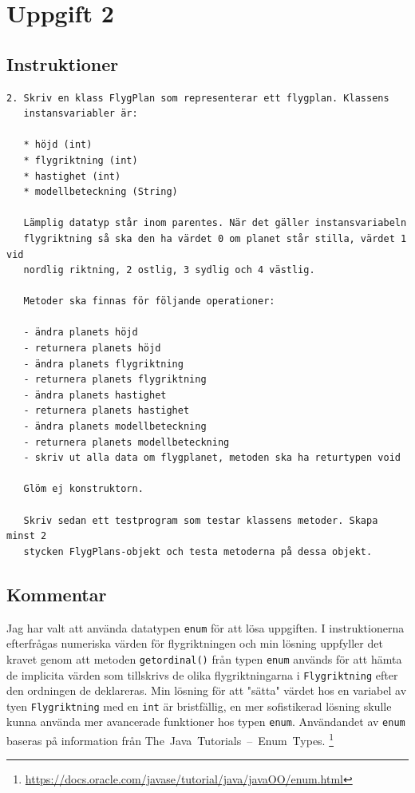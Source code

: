 \section{Uppgift 2}\label{sec:uppg02}

\subsection{Instruktioner}
\begin{verbatim}
2. Skriv en klass FlygPlan som representerar ett flygplan. Klassens
   instansvariabler är:

   * höjd (int)
   * flygriktning (int)
   * hastighet (int)
   * modellbeteckning (String)

   Lämplig datatyp står inom parentes. När det gäller instansvariabeln
   flygriktning så ska den ha värdet 0 om planet står stilla, värdet 1 vid
   nordlig riktning, 2 ostlig, 3 sydlig och 4 västlig.

   Metoder ska finnas för följande operationer:

   - ändra planets höjd
   - returnera planets höjd
   - ändra planets flygriktning
   - returnera planets flygriktning
   - ändra planets hastighet
   - returnera planets hastighet
   - ändra planets modellbeteckning
   - returnera planets modellbeteckning
   - skriv ut alla data om flygplanet, metoden ska ha returtypen void

   Glöm ej konstruktorn.

   Skriv sedan ett testprogram som testar klassens metoder. Skapa minst 2
   stycken FlygPlans-objekt och testa metoderna på dessa objekt.
\end{verbatim}


\subsection{Kommentar}
Jag har valt att använda datatypen \texttt{enum} för att lösa uppgiften.  I
instruktionerna efterfrågas numeriska värden för flygriktningen och min lösning
uppfyller det kravet genom att metoden \texttt{getordinal()} från typen
\texttt{enum} används för att hämta de implicita värden som tillskrivs de olika
flygriktningarna i \texttt{Flygriktning} efter den ordningen de deklareras.
Min lösning för att "sätta" värdet hos en variabel av tyen
\texttt{Flygriktning} med en \texttt{int} är bristfällig, en mer sofistikerad
lösning skulle kunna använda mer avancerade funktioner hos typen \texttt{enum}.
Användandet av \texttt{enum} baseras på information från
\mbox{The Java Tutorials -- Enum Types}.
\footnote{\url{https://docs.oracle.com/javase/tutorial/java/javaOO/enum.html}}


